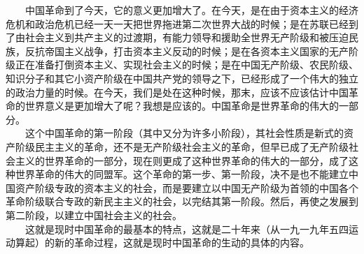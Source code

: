 \documentclass[cn,11pt,chinese]{elegantbook}
\begin{document}
　　中国革命到了今天，它的意义更加增大了。在今天，是在由于资本主义的经济危机和政治危机已经一天一天把世界拖进第二次世界大战的时候；是在苏联已经到了由社会主义到共产主义的过渡期，有能力领导和援助全世界无产阶级和被压迫民族，反抗帝国主义战争，打击资本主义反动的时候；是在各资本主义国家的无产阶级正在准备打倒资本主义、实现社会主义的时候；是在中国无产阶级、农民阶级、知识分子和其它小资产阶级在中国共产党的领导之下，已经形成了一个伟大的独立的政治力量的时候。在今天，我们是处在这种时候，那末，应该不应该估计中国革命的世界意义是更加增大了呢？我想是应该的。中国革命是世界革命的伟大的一部分。\\
　　这个中国革命的第一阶段（其中又分为许多小阶段），其社会性质是新式的资产阶级民主主义的革命，还不是无产阶级社会主义的革命，但早已成了无产阶级社会主义的世界革命的一部分，现在则更成了这种世界革命的伟大的一部分，成了这种世界革命的伟大的同盟军。这个革命的第一步、第一阶段，决不是也不能建立中国资产阶级专政的资本主义的社会，而是要建立以中国无产阶级为首领的中国各个革命阶级联合专政的新民主主义的社会，以完结其第一阶段。然后，再使之发展到第二阶段，以建立中国社会主义的社会。\\
　　这就是现时中国革命的最基本的特点，这就是二十年来（从一九一九年五四运动算起）的新的革命过程，这就是现时中国革命的生动的具体的内容。\\
\end{document}
